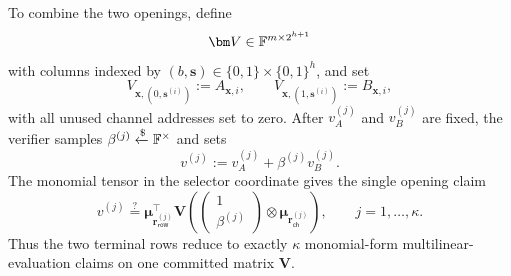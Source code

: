 \documentclass[runningheads]{llncs}
\begin{document}
To combine the two openings, define
\[
    \bm V\in\Field^{m\times2^{h+1}}
\]
with columns indexed by
\((b,\bm s)\in\{0,1\}\times\{0,1\}^h\), and set
\begin{equation}
    V_{\bm x,(0,\bm s^{(i)})}:=A_{\bm x,i},
    \qquad
    V_{\bm x,(1,\bm s^{(i)})}:=B_{\bm x,i},
\label{eq:wht-combined-input}
\end{equation}
with all unused channel addresses set to zero.  After
\(v_A^{(j)}\) and \(v_B^{(j)}\) are fixed, the verifier samples
\(\beta^{(j)}\mathrel{\xleftarrow{\$}}{\mathbb{F}}^\times\) and sets
\[
    v^{(j)}
      :=
      v_A^{(j)}+\beta^{(j)}v_B^{(j)}.
\]
The monomial tensor in the selector coordinate gives the single
opening claim
\begin{equation}
    v^{(j)}
      \stackrel{?}{=}
      \bm\mu_{\bm r_{\mathsf{row}}^{(j)}}^\top
      \bm V
      \left(
        \begin{pmatrix}1\\ \beta^{(j)}\end{pmatrix}
        \otimes
        \bm\mu_{\bm r_{\mathsf{ch}}^{(j)}}
      \right),
    \qquad j=1,\ldots,\kappa.
\label{eq:wht-terminal-mle-claims}
\end{equation}
Thus the two terminal rows reduce to exactly \(\kappa\) monomial-form
multilinear-evaluation claims on one committed matrix \(\bm V\).
\end{document}
